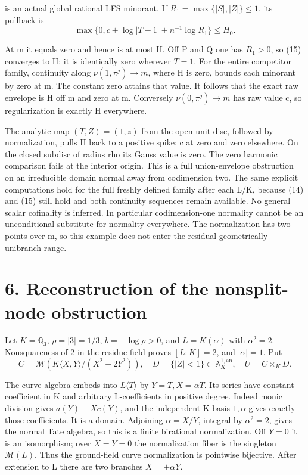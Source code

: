 \documentclass[11pt,a4paper]{article}
\begin{document}
is an actual global rational LFS minorant. If \(R_1=\max\{|S|,|Z|\}\leq1\), its pullback is
\[
\max\{0,c+\log|T-1|+n^{-1}\log R_1\}\leq H_0.
\]

At m it equals zero and hence is at most H. Off P and Q one has \(R_1>0\), so (15) converges to H; it is identically zero wherever \(T=1\). For the entire competitor family, continuity along \(\nu(1,\pi^j)\longrightarrow m\), where H is zero, bounds each minorant by zero at m. The constant zero attains that value. It follows that the exact raw envelope is H off m and zero at m. Conversely \(\nu(0,\pi^j)\longrightarrow m\) has raw value c, so regularization is exactly H everywhere.

The analytic map \((T,Z)=(1,z)\) from the open unit disc, followed by normalization, pulls H back to a positive spike: c at zero and zero elsewhere. On the closed subdisc of radius rho its Gauss value is zero. The zero harmonic comparison fails at the interior origin. This is a full union-envelope obstruction on an irreducible domain normal away from codimension two. The same explicit computations hold for the full freshly defined family after each L/K, because (14) and (15) still hold and both continuity sequences remain available. No general scalar cofinality is inferred. In particular codimension-one normality cannot be an unconditional substitute for normality everywhere. The normalization has two points over m, so this example does not enter the residual geometrically unibranch range.

\section*{6. Reconstruction of the nonsplit-node obstruction}

Let \(K=\mathbb Q_3\), \(\rho=|3|=1/3\), \(b=-\log\rho>0\), and \(L=K(\alpha)\) with \(\alpha^2=2\). Nonsquareness of 2 in the residue field proves \([L:K]=2\), and \(|\alpha|=1\). Put
\[
C=\mathcal M(K\langle X,Y\rangle/(X^2-2Y^2)),\quad
D=\{|Z|<1\}\subset\mathbb A_K^{1,\mathrm{an}},\quad U=C\times_K D.
\tag{16}
\]

The curve algebra embeds into \(L\langle T\rangle\) by \(Y=T,X=\alpha T\). Its series have constant coefficient in K and arbitrary L-coefficients in positive degree. Indeed monic division gives \(a(Y)+Xc(Y)\), and the independent K-basis \(1,\alpha\) gives exactly those coefficients. It is a domain. Adjoining \(\alpha=X/Y\), integral by \(\alpha^2=2\), gives the normal Tate algebra, so this is a finite birational normalization. Off \(Y=0\) it is an isomorphism; over \(X=Y=0\) the normalization fiber is the singleton \(\mathcal M(L)\). Thus the ground-field curve normalization is pointwise bijective. After extension to L there are two branches \(X=\pm\alpha Y\).
\end{document}

